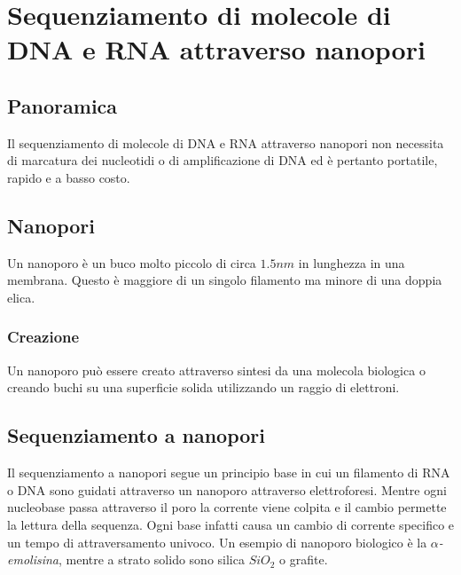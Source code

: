 \section{Sequenziamento di molecole di DNA e RNA attraverso nanopori}

	\subsection{Panoramica}
	Il sequenziamento di molecole di DNA e RNA attraverso nanopori non necessita di marcatura dei nucleotidi o di amplificazione di DNA ed \`e pertanto portatile, rapido e a basso costo.

	\subsection{Nanopori}
	Un nanoporo \`e un buco molto piccolo di circa $1.5nm$ in lunghezza in una membrana.
	Questo \`e maggiore di un singolo filamento ma minore di una doppia elica.

		\subsubsection{Creazione}
		Un nanoporo pu\`o essere creato attraverso sintesi da una molecola biologica o creando buchi su una superficie solida utilizzando un raggio di elettroni.

	\subsection{Sequenziamento a nanopori}
	Il sequenziamento a nanopori segue un principio base in cui un filamento di RNA o DNA sono guidati attraverso un nanoporo attraverso elettroforesi.
	Mentre ogni nucleobase passa attraverso il poro la corrente viene colpita e il cambio permette la lettura della sequenza.
	Ogni base infatti causa un cambio di corrente specifico e un tempo di attraversamento univoco.
	Un esempio di nanoporo biologico \`e la \emph{$\alpha$-emolisina}, mentre a strato solido sono silica \emph{$SiO_2$} o grafite.

